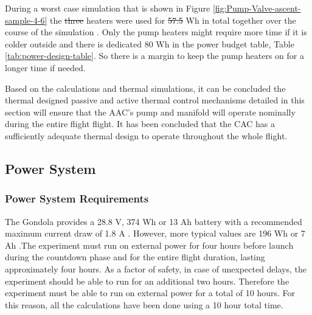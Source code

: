 \documentclass[a4paper,12pt,twoside]{article}
\providecommand{\DIFaddtex}[1]{{\protect\color{blue}\uwave{#1}}} %
\providecommand{\DIFdeltex}[1]{{\protect\color{red}\sout{#1}}}                      %
\providecommand{\DIFaddbegin}{} %
\providecommand{\DIFaddend}{} %
\providecommand{\DIFdelbegin}{} %
\providecommand{\DIFdelend}{} %
\providecommand{\DIFadd}[1]{\texorpdfstring{\DIFaddtex{#1}}{#1}} %
\providecommand{\DIFdel}[1]{\texorpdfstring{\DIFdeltex{#1}}{}} %
\newcommand{\DIFscaledelfig}{0.5}
\newlength{\DIFdelgraphicswidth} %
\newlength{\DIFdelgraphicsheight} %
\newcommand{\DIFaddincludegraphics}[2][]{{\color{blue}\fbox{\DIFOincludegraphics[#1]{#2}}}} %
\newcommand{\DIFdelincludegraphics}[2][]{%
\sbox{\DIFdelgraphicsbox}{\DIFOincludegraphics[#1]{#2}}%
\settoboxwidth{\DIFdelgraphicswidth}{\DIFdelgraphicsbox} %
\settoboxtotalheight{\DIFdelgraphicsheight}{\DIFdelgraphicsbox} %
\scalebox{\DIFscaledelfig}{%
\parbox[b]{\DIFdelgraphicswidth}{\usebox{\DIFdelgraphicsbox}\\[-\baselineskip] \rule{\DIFdelgraphicswidth}{0em}}\llap{\resizebox{\DIFdelgraphicswidth}{\DIFdelgraphicsheight}{%
\setlength{\unitlength}{\DIFdelgraphicswidth}%
\begin{picture}(1,1)%
\thicklines\linethickness{2pt} %
{\color[rgb]{1,0,0}\put(0,0){\framebox(1,1){}}}%
{\color[rgb]{1,0,0}\put(0,0){\line( 1,1){1}}}%
{\color[rgb]{1,0,0}\put(0,1){\line(1,-1){1}}}%
\end{picture}%
}\hspace*{3pt}}} %
} %
\DeclareRobustCommand{\DIFaddbegin}{\DIFOaddbegin \let\includegraphics\DIFaddincludegraphics} %
\DeclareRobustCommand{\DIFaddend}{\DIFOaddend \let\includegraphics\DIFOincludegraphics} %
\DeclareRobustCommand{\DIFdelbegin}{\DIFOdelbegin \let\includegraphics\DIFdelincludegraphics} %
\DeclareRobustCommand{\DIFdelend}{\DIFOaddend \let\includegraphics\DIFOincludegraphics} %
\begin{document}
\DIFaddend During a worst case simulation that is shown in Figure \ref{fig:Pump-Valve-ascent-sample-4-6} the \DIFdelbegin \DIFdel{three }\DIFdelend \DIFaddbegin \DIFadd{four }\DIFaddend heaters were used for \DIFdelbegin \DIFdel{57.5 }\DIFdelend \DIFaddbegin \DIFadd{26.66 }\DIFaddend Wh in total together over the course of the simulation \DIFaddbegin \DIFadd{the figures are from}\DIFaddend . Only the pump heaters might require more time if it is colder outside and there is dedicated 80 Wh in the power budget table, Table \ref{tab:power-design-table}. So there is a margin to keep the pump heaters on for a longer time if needed.

Based on the calculations and thermal simulations, it can be concluded the thermal designed passive and active thermal control mechanisms detailed in this section will ensure that the AAC's pump and manifold will operate nominally during the entire flight flight. It has been concluded that the CAC has a sufficiently adequate thermal design to operate throughout the whole flight. 
\DIFaddbegin 




\DIFaddend \pagebreak
\subsection{Power System}

\subsubsection{Power System Requirements}
\begin{centering}
The Gondola provides a 28.8 V, 374 Wh or 13 Ah battery with a recommended maximum current draw of 1.8 A . However, more typical values are 196 Wh or 7 Ah \cite{BexusManual}.The experiment must run on external power for four hours before launch during the countdown phase and for the entire flight duration, lasting approximately four hours. As a factor of safety, in case of unexpected delays, the experiment should be able to run for an additional two hours. Therefore the experiment must be able to run on external power for a total of 10 hours. For this reason, all the calculations have been done using a 10 hour total time.
\end{centering}
\end{document}

